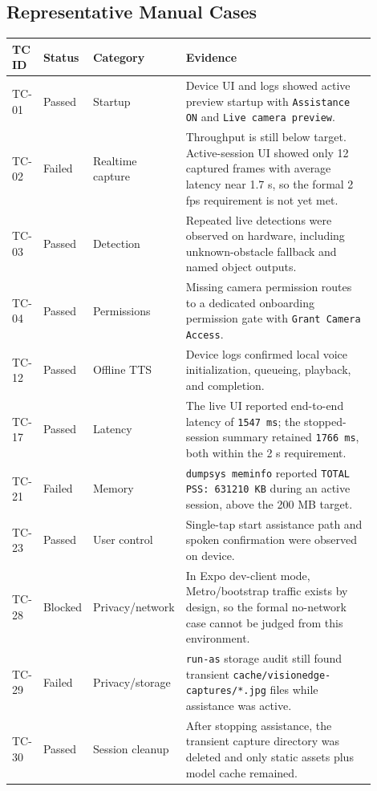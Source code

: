 \documentclass[conference]{IEEEtran}
\begin{document}
\subsection{Representative Manual Cases}
\begin{table}[t]
\centering
\begin{tabular}{p{0.08\linewidth} p{0.10\linewidth} p{0.16\linewidth} p{0.56\linewidth}}
\toprule
TC ID & Status & Category & Evidence \\
\midrule
TC-01 & Passed & Startup & Device UI and logs showed active preview startup with \texttt{Assistance ON} and \texttt{Live camera preview}. \\
TC-02 & Failed & Realtime capture & Throughput is still below target. Active-session UI showed only 12 captured frames with average latency near 1.7 s, so the formal 2 fps requirement is not yet met. \\
TC-03 & Passed & Detection & Repeated live detections were observed on hardware, including unknown-obstacle fallback and named object outputs. \\
TC-04 & Passed & Permissions & Missing camera permission routes to a dedicated onboarding permission gate with \texttt{Grant Camera Access}. \\
TC-12 & Passed & Offline TTS & Device logs confirmed local voice initialization, queueing, playback, and completion. \\
TC-17 & Passed & Latency & The live UI reported end-to-end latency of \texttt{1547 ms}; the stopped-session summary retained \texttt{1766 ms}, both within the 2 s requirement. \\
TC-21 & Failed & Memory & \texttt{dumpsys meminfo} reported \texttt{TOTAL PSS: 631210 KB} during an active session, above the 200 MB target. \\
TC-23 & Passed & User control & Single-tap start assistance path and spoken confirmation were observed on device. \\
TC-28 & Blocked & Privacy/network & In Expo dev-client mode, Metro/bootstrap traffic exists by design, so the formal no-network case cannot be judged from this environment. \\
TC-29 & Failed & Privacy/storage & \texttt{run-as} storage audit still found transient \texttt{cache/visionedge-captures/*.jpg} files while assistance was active. \\
TC-30 & Passed & Session cleanup & After stopping assistance, the transient capture directory was deleted and only static assets plus model cache remained. \\

\end{tabular}
\end{table}
\end{document}
